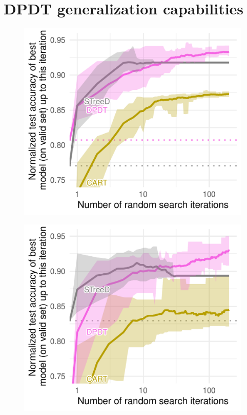 \section{DPDT generalization capabilities}\label{sec:generalization}
\begin{figure}
    \centering
    \begin{minipage}{0.24\textwidth}
        \includegraphics[width=\textwidth]{images/figures/tab_bench/random_search_classif_numerical_depth5.pdf}
        \label{fig:gen-num}
    \end{minipage}
    \begin{minipage}{0.24\textwidth}
        \includegraphics[width=\textwidth]{images/figures/tab_bench/random_search_classif_categorical_depth5.pdf}

\end{minipage}
\end{figure}
